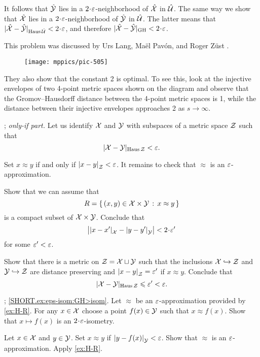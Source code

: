 It follows that $\hat{\mathcal{Y}}$ lies in a $2\cdot\eps$-neighborhood of $\hat{\mathcal{X}}$ in $\hat{\mathcal{U}}$.
The same way we show that $\hat{\mathcal{X}}$ lies in a $2\cdot\eps$-neighborhood of $\hat{\mathcal{Y}}$ in $\hat{\mathcal{U}}$.
The latter means that
$|\hat{\spc{X}}-\hat{\spc{Y}}|_{\Haus\hat{\spc{U}}}<2\cdot\eps$,
and therefore
$|\hat{\spc{X}}-\hat{\spc{Y}}|_{\GH}<2\cdot\eps$.

This problem was discussed by Urs Lang, Maël Pavón, and Roger Züst \cite[3.1]{lang-pavon-zust}.
\begin{figure}[ht!]
\vskip-0mm
\centering
\texttt{[image: mppics/pic-505]}
\end{figure}
They also show that the constant 2 is optimal.
To see this, look at the injective envelopes of two 4-point metric spaces shown on the diagram and observe that the Gromov--Hausdorff distance between the 4-point metric spaces is 1, while the distance between their injective envelopes approaches 2 as $s\to\infty$. 

\parbf{\ref{ex:H-R}}; \textit{only-if part.}
Let us identify $\mathcal{X}$ and $\mathcal{Y}$ with subspaces of a metric space $\mathcal{Z}$ such that 
\[|\mathcal{X}-\mathcal{Y}|_{\operatorname{\rm Haus}\nolimits \mathcal{Z}}<\varepsilon.\]

Set $x\approx y$ if and only if $\dist{x}{y}{\spc{Z}}<\eps$.
It remains to check that $\approx$ is an $\varepsilon$-approximation.

Show that we can assume that 
\[R=\left\{\,{(x,y)\in\mathcal{X}\times\mathcal{Y}}\,:\,{x\approx y}\,\right\}\] is a compact subset of $\mathcal{X}\times\mathcal{Y}$.
Conclude that
\[\bigl|\dist{x}{x'}{\spc{X}}-\dist{y}{y'}{\spc{Y}}\bigr|<2\cdot\eps'\]
for some $\varepsilon'<\varepsilon$.

Show that there is a metric on $\mathcal{Z}=\mathcal{X}\sqcup\mathcal{Y}$ such that the inclusions $\mathcal{X}\hookrightarrow\mathcal{Z}$ and
$\mathcal{Y}\hookrightarrow\mathcal{Z}$ are distance preserving and $\dist{x}{y}{\spc{Z}}=\eps'$ if $x\approx y$.
Conclude that 
\[|\mathcal{X}-\mathcal{Y}|_{\operatorname{\rm Haus}\nolimits \mathcal{Z}}\leqslant\varepsilon'<\varepsilon.\]

\parbf{\ref{ex:eps-isom}};
\ref{SHORT.ex:eps-isom:GH>isom}.
Let $\approx$ be an $\varepsilon$-approximation provided by \ref{ex:H-R}.
For any $x\in\mathcal{X}$ choose a point $f(x)\in\mathcal{Y}$ such that $x\approx f(x)$.
Show that $x\mapsto f(x)$ is an $2\cdot\eps$-isometry.

Let $x\in\mathcal{X}$ and $y\in\mathcal{Y}$.
Set $x\approx y$ if $\dist{y}{f(x)}{\spc{Y}}<\eps$.
Show that $\approx$ is an $\varepsilon$-approximation. 
Apply \ref{ex:H-R}.

